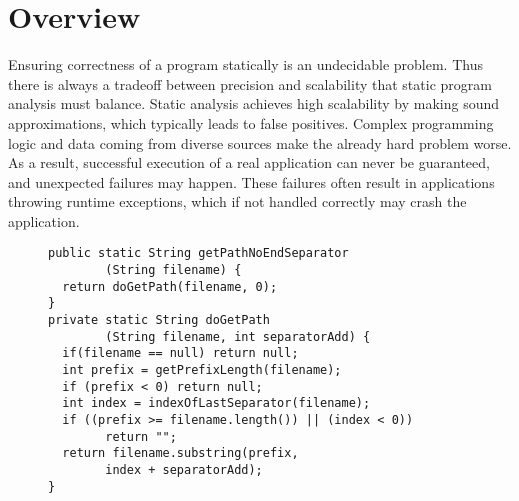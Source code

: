 \section{Overview}
\label{sec:overview}

Ensuring correctness of a program statically is an undecidable problem. Thus
there is always a tradeoff between precision and scalability that static program
analysis must balance. Static analysis achieves high scalability by making sound
approximations, which typically leads to false positives. Complex
programming logic and data coming from diverse sources make the already hard
problem worse. As a result, successful execution of a real application can never
be guaranteed, and unexpected failures may happen. These failures often result
in applications throwing runtime exceptions, which if not handled correctly
may crash the application.



\begin{figure}[t]
\centering
\begin{lstlisting}
public static String getPathNoEndSeparator
        (String filename) {
  return doGetPath(filename, 0);
}
private static String doGetPath
        (String filename, int separatorAdd) {
  if(filename == null) return null;
  int prefix = getPrefixLength(filename);
  if (prefix < 0) return null;
  int index = indexOfLastSeparator(filename);
  if ((prefix >= filename.length()) || (index < 0))
        return "";
  return filename.substring(prefix,
        index + separatorAdd);
}
\end{lstlisting}
\end{figure}

